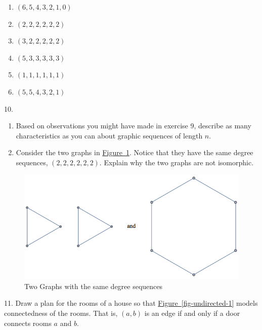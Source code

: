 \documentclass[10pt,]{book}
\theoremstyle{plain}
\theoremstyle{definition}
\theoremstyle{definition}
\theoremstyle{definition}
\theoremstyle{definition}
\theoremstyle{definition}
\numberwithin{equation}{section}
\begin{document}
\begin{exercisegroup}
\begin{enumerate}[label=\alph*]
\item\hypertarget{li-15}{}  \((6, 5, 4, 3, 2, 1, 0)\)%
\item\hypertarget{li-16}{} \((2,2,2,2,2,2)\)%
\item\hypertarget{li-17}{} \((3,2,2,2,2,2)\)%
\item\hypertarget{li-18}{} \((5,3,3,3,3,3)\)%
\item\hypertarget{li-19}{} \((1,1,1,1,1,1)\)%
\item\hypertarget{li-20}{} \((5,5,4,3,2,1)\)%
\end{enumerate}
%
\par\smallskip
\item[10.]\hypertarget{exercise-10}{}\leavevmode%
\begin{enumerate}[label=\alph*]
\item\hypertarget{li-21}{}Based on observations you might have made in exercise 9, describe as many characteristics as you can about graphic sequences of length
\(n\).%
\item\hypertarget{li-22}{} Consider the two graphs in \hyperref[fig-same-ds-9-1]{Figure~\ref{fig-same-ds-9-1}}. Notice that they have the same degree sequences, \((2,2,2,2,2,2)\).  Explain why the two graphs are not isomorphic.%
\end{enumerate}
%
\leavevmode%
\begin{figure}
\centering
\includegraphics[width=1\linewidth]{images/fig-same-ds-9-1.png}
\caption{Two Graphs with the same degree sequences
                \label{fig-same-ds-9-1}}
\end{figure}
\par\smallskip
\item[11.]\hypertarget{exercise-house-9-1}{}Draw a plan for the rooms of a house so that \hyperref[fig-undirected-1]{Figure~\ref{fig-undirected-1}} models connectedness of the rooms.  That is, \((a,b)\) is an edge if and only if a door connects rooms \(a\) and \(b\). %
\par\smallskip
\end{exercisegroup}
\par\smallskip\noindent
\typeout{************************************************}
\typeout{************************************************}
\end{document}
